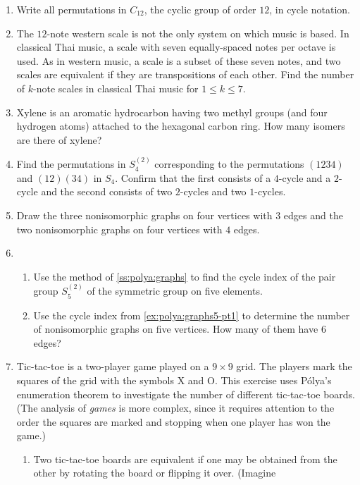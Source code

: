 \begin{enumerate}
\item Write all permutations in $C_{12}$, the cyclic group of order
  $12$, in cycle notation.\label{ex:polya:cyclic12}
\item The $12$-note western scale is not the only system on which
  music is based. In classical Thai music, a scale with seven
  equally-spaced notes per octave is used. As in western music, a
  scale is a subset of these seven notes, and two scales are
  equivalent if they are transpositions of each other. Find the number
  of $k$-note scales in classical Thai music for $1\leq k\leq 7$.
\item Xylene is an aromatic hydrocarbon having two methyl groups (and
  four hydrogen atoms) attached to the hexagonal carbon ring. How many
  isomers are there of xylene?
\item Find the permutations in $S_4^{(2)}$ corresponding to the
  permutations $(1234)$ and $(12)(34)$ in $S_4$. Confirm that the
  first consists of a $4$-cycle and a $2$-cycle and the second
  consists of two $2$-cycles and two $1$-cycles.\label{ex:polya:perm-pairs}
\item Draw the three nonisomorphic graphs on four vertices with $3$
  edges and the two nonisomorphic graphs on four vertices with $4$ edges.
\item
  \begin{enumerate}
  \item Use the method of \autoref{ss:polya:graphs} to find the cycle
    index of the pair group $S_5^{(2)}$ of the symmetric group on five
    elements.\label{ex:polya:graphs5-pt1}
  \item Use the cycle index from \ref{ex:polya:graphs5-pt1} to
    determine the number of nonisomorphic graphs on five vertices. How
    many of them have $6$ edges?
  \end{enumerate}
\item Tic-tac-toe is a two-player game played on a $9\times 9$
  grid. The players mark the squares of the grid with the symbols X
  and O. This exercise uses P\'olya's enumeration theorem to
  investigate the number of different tic-tac-toe boards. (The
  analysis of \emph{games} is more complex, since it requires
  attention to the order the squares are marked and stopping when one
  player has won the game.)
  \begin{enumerate}
  \item Two tic-tac-toe boards are equivalent if one may be obtained
    from the other by rotating the board or flipping it over. (Imagine

\end{enumerate}
\end{enumerate}

